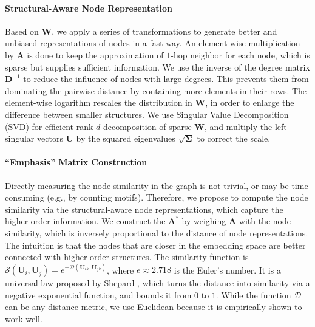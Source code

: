 \paragraph{Structural-Aware Node Representation}
Based on ${\boldsymbol W}$, we apply a series of transformations to generate better and unbiased representations of nodes in a fast way.
An element-wise multiplication by ${\boldsymbol A}$ is done to keep the approximation of $1$-hop neighbor for each node, which is sparse but supplies sufficient information.
We use the inverse of the degree matrix ${\boldsymbol D}^{-1}$ to reduce the influence of nodes with large degrees.
This prevents them from dominating the pairwise distance by containing more elements in their rows. 
The element-wise logarithm rescales the distribution in ${\boldsymbol W}$, in order to enlarge the difference between smaller structures.
We use Singular Value Decomposition (SVD) for efficient rank-$d$ decomposition of sparse ${\boldsymbol W}$, and multiply the left-singular vectors ${\boldsymbol U}$ by the squared eigenvalues $\sqrt{{\boldsymbol \Sigma}}$ to correct the scale.

\paragraph{``Emphasis'' Matrix Construction}
Directly measuring the node similarity in the graph is not trivial, or may be time consuming (e.g., by counting motifs).
Therefore, we propose to compute the node similarity via the structural-aware node representations, which capture the higher-order information.
We construct the \emphasis ${\boldsymbol A}^{*}$ by weighing ${\boldsymbol A}$ with the node similarity, which is inversely proportional to the distance of node representations.
The intuition is that the nodes that are closer in the embedding space are better connected with higher-order structures. 
The similarity function is
$\mathcal{S}({\boldsymbol U}_{i}, {\boldsymbol U}_{j}) = e^{-\mathcal{D}({\boldsymbol U}_{ik}, {\boldsymbol U}_{jk})}$,
where $e \approx 2.718$ is the Euler's number. 
It is a universal law proposed by Shepard \cite{shepard1987toward}, which turns the distance into similarity via a negative exponential function, and bounds it from $0$ to $1$. 
While the function $\mathcal{D}$ can be any distance metric, we use Euclidean because it is empirically shown to work well.

